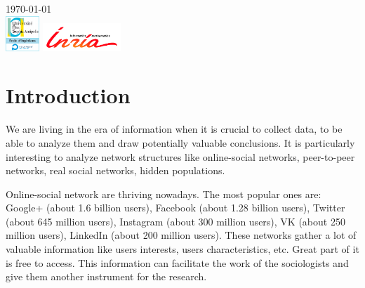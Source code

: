 \documentclass[12pt]{report}
\begin{document}
\begin{titlepage}

{\large \today}\\[1cm] %


\includegraphics[height=50px]{univer} \qquad\qquad
\includegraphics[height=40px]{inria}\\[1cm] 
 

\vfill %

\end{titlepage}

\tableofcontents

\chapter*{Introduction}

We are living in the era of information when it is crucial to collect data, to be able to analyze them and draw potentially valuable conclusions. It is particularly  interesting to analyze network structures like online-social networks, peer-to-peer networks, real social networks, hidden populations.

Online-social network are thriving nowadays. The most popular ones are: Google+ (about 1.6 billion users), Facebook (about 1.28 billion users), Twitter (about 645 million users), Instagram (about 300 million users), VK (about 250 million users), LinkedIn (about 200 million users). These networks gather a lot of valuable information like users interests, users characteristics, etc. Great part of it is free to access. This information can facilitate the work of the sociologists and give them another instrument for the research.
\end{document}
